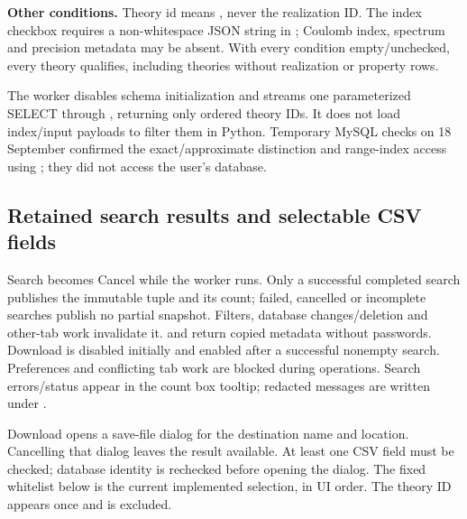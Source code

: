\textbf{Other conditions.} Theory id means , never the
realization ID. The index checkbox requires a non-whitespace JSON string in
; Coulomb index, spectrum and precision
metadata may be absent. With every condition empty/unchecked, every theory
qualifies, including theories without realization or property rows.

The worker disables schema initialization and streams one parameterized
SELECT through , returning only ordered theory IDs.
It does not load index/input payloads to filter them in Python. Temporary
MySQL checks on 18 September confirmed the exact/approximate distinction and
range-index access using ; they did not access the user's database.

\clearpage
\subsection{Retained search results and selectable CSV fields}
Search becomes Cancel while the worker runs. Only a successful completed
search publishes the immutable  tuple and its count;
failed, cancelled or incomplete searches publish no partial snapshot.
Filters, database changes/deletion and other-tab work invalidate it.
 and  return copied metadata without passwords.
Download is disabled initially and enabled after a successful nonempty search.
Preferences and conflicting tab work are blocked during operations.
Search errors/status appear in the count box tooltip; redacted messages are
written under .

Download opens a save-file dialog for the destination name and location.
Cancelling that dialog leaves the result available. At least one CSV field
must be checked; database identity is rechecked before opening the dialog.
The fixed whitelist below is the current implemented selection, in UI order.
The theory ID appears once and  is excluded.

